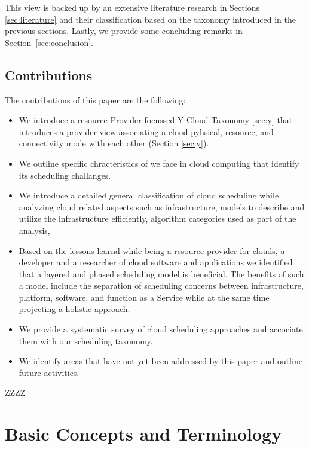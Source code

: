 \documentclass[final,5p,times,twocolumn]{elsarticle}
\begin{document}
This view is backed up by an extensive
literature research in Sections \ref{sec:literature} and their classification
based on the taxonomy introduced in the previous sections. Lastly, we provide
some concluding remarks in Section~\ref{sec:conclusion}.

\subsection{Contributions}

The contributions of this paper are the following:

\begin{itemize}

\item We introduce a resource Provider focussed Y-Cloud Taxonomy
  \ref{sec:y} that introduces a provider view associating a cloud
  pyhsical, resource, and connectivity mode with each other (Section
  \ref{sec:y}).

\item We outline specific chracteristics of we face in cloud computing
  that identify its scheduling challanges.

\item We introduce a detailed general classification of cloud
  scheduling while analyzing cloud related aspects such as
  infrastructure, models to describe and utilize the infrastructure
  efficiently, algorithm categories used as part of the analysis,

\item Based on the lessons learnd while being a resource provider for
  clouds, a developer and a researcher of cloud software and
  applications we identified that a layered and phased scheduling
  model is beneficial. The benefits of such a model include the
  separation of scheduling concerns between infrastructure, platform, software,
  and function as a Service while at the same time projecting a
  holistic approach.

\item We provide a systematic survey of cloud scheduling approaches
  and accociate them with our scheduling taxonomy.

\item We identify areas that have not yet been addressed by this paper
  and outline future activities.

\end{itemize}

ZZZZ

\section{Basic Concepts and Terminology}\label{sec:terminology}
\end{document}

